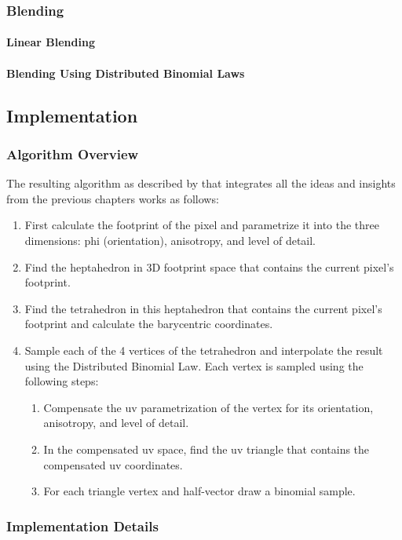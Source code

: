 \subsubsection{Blending}
\label{sec:blending}


\paragraph{Linear Blending}
\label{sec:blending-linear}


\paragraph{Blending Using Distributed Binomial Laws}
\label{sec:blending-distributed}




\subsection{Implementation}
\label{sec:implementation}


\subsubsection{Algorithm Overview}
\label{sec:algorithm}

The resulting algorithm as described by \textcite{deliot2023} that integrates all the ideas and insights from the previous chapters works as follows:
%
\begin{enumerate}
    \item First calculate the footprint of the pixel and parametrize it into the three dimensions: phi (orientation), anisotropy, and level of detail.
    \item Find the heptahedron in 3D footprint space that contains the current pixel's footprint.
    \item Find the tetrahedron in this heptahedron that contains the current pixel's footprint and calculate the barycentric coordinates.
    \item Sample each of the 4 vertices of the tetrahedron and interpolate the result using the Distributed Binomial Law. Each vertex is sampled using the following steps:
          \begin{enumerate}
              \item Compensate the uv parametrization of the vertex for its orientation, anisotropy, and level of detail.
              \item In the compensated uv space, find the uv triangle that contains the compensated uv coordinates.
              \item For each triangle vertex and half-vector draw a binomial sample.
          \end{enumerate}
\end{enumerate}


\subsubsection{Implementation Details}
\label{sec:implementation-details}